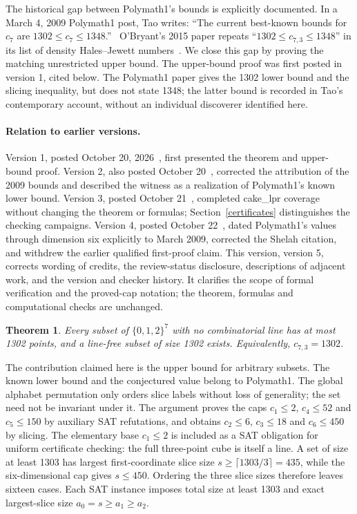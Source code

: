 \documentclass[11pt]{article}
\newtheorem{theorem}{Theorem}
\newcommand{\cube}[1]{\{0,1,2\}^{#1}}
\begin{document}
The historical gap between Polymath1's bounds is explicitly documented. In a March 4, 2009 Polymath1 post, Tao writes: ``The current best-known bounds for $c_7$ are $1302\leq c_7\leq1348$.''~\cite{tao2009} O'Bryant's 2015 paper repeats ``$1302\leq c_{7,3}\leq1348$'' in its list of density Hales--Jewett numbers~\cite[Section 3.3, p.~7]{obryant}. We close this gap by proving the matching unrestricted upper bound. The upper-bound proof was first posted in version 1, cited below. The Polymath1 paper gives the 1302 lower bound and the slicing inequality, but does not state 1348; the latter bound is recorded in Tao's contemporary account, without an individual discoverer identified here.

\paragraph{Relation to earlier versions.}
Version 1, posted October 20, 2026~\cite{previousone}, first presented the theorem and upper-bound proof. Version 2, also posted October 20~\cite{previous}, corrected the attribution of the 2009 bounds and described the witness as a realization of Polymath1's known lower bound. Version 3, posted October 21~\cite{previousthree}, completed cake\_lpr coverage without changing the theorem or formulas; Section~\ref{certificates} distinguishes the checking campaigns. Version 4, posted October 22~\cite{previousfour}, dated Polymath1's values through dimension six explicitly to March 2009, corrected the Shelah citation, and withdrew the earlier qualified first-proof claim. This version, version 5, corrects wording of credits, the review-status disclosure, descriptions of adjacent work, and the version and checker history. It clarifies the scope of formal verification and the proved-cap notation; the theorem, formulas and computational checks are unchanged.

\begin{theorem}\label{main}
Every subset of $\cube 7$ with no combinatorial line has at most 1302 points, and a line-free subset of size 1302 exists. Equivalently, $c_{7,3}=1302$.
\end{theorem}

The contribution claimed here is the upper bound for arbitrary subsets. The known lower bound and the conjectured value belong to Polymath1. The global alphabet permutation only orders slice labels without loss of generality; the set need not be invariant under it. The argument proves the caps $c_1\leq2$, $c_4\leq52$ and $c_5\leq150$ by auxiliary SAT refutations, and obtains $c_2\leq6$, $c_3\leq18$ and $c_6\leq450$ by slicing. The elementary base $c_1\leq2$ is included as a SAT obligation for uniform certificate checking: the full three-point cube is itself a line. A set of size at least 1303 has largest first-coordinate slice size $s\geq\lceil1303/3\rceil=435$, while the six-dimensional cap gives $s\leq450$. Ordering the three slice sizes therefore leaves sixteen cases. Each SAT instance imposes total size at least 1303 and exact largest-slice size $a_0=s\geq a_1\geq a_2$.
\end{document}
